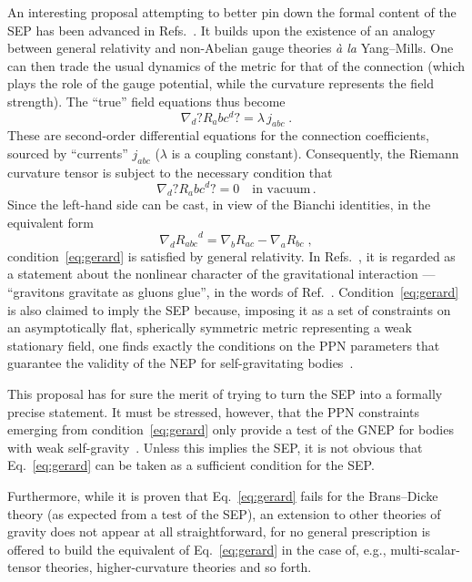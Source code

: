 \documentclass[a4paper,showkeys,aps,prd,reprint,nofootinbib,showpacs,twocolumn]{revtex4-1}
\newcommand{\eq}[1]{\( #1 \)}
\newcommand{\eqd}[1]{\begin{equation} #1 \end{equation}}
\theoremstyle{plain}
\begin{document}
An interesting proposal attempting to better pin down the formal content of the SEP has been advanced in Refs.~\cite{Gerard:2006ia, Gerard:2008nc}.  It builds upon the existence of an analogy between general relativity and non-Abelian gauge theories \emph{\`a la} Yang--Mills. One can then trade the usual dynamics of the metric for that of the connection (which plays the role of the gauge potential, while the curvature represents the field strength).  The ``true'' field equations thus become
%
\eqd{\nabla_{\! d} ?R_abc^d? = \lambda\, j_{abc} \;.
\label{gauge}}
%
These are second-order differential equations for the connection coefficients, sourced by ``currents'' \eq{j_{abc}} (\eq{\lambda} is a coupling constant).  Consequently, the Riemann curvature tensor is subject to the necessary condition that
%
\eqd{\nabla_{\! d} ?R_abc^d? = 0 \quad \text{in vacuum} \,. \label{eq:gerard}}
%
Since the left-hand side can be cast, in view of the Bianchi identities, in the equivalent form
%
\eqd{\nabla_{\! d} {R_{abc}}^d = \nabla_{\! b} R_{ac} - \nabla_{\! a} R_{bc} \;,\label{eq:rotR}}
%
condition~\eqref{eq:gerard} is satisfied by general relativity.  In Refs.~\cite{Gerard:2006ia, Gerard:2008nc}, it is regarded as a statement about the nonlinear character of the gravitational interaction --- ``gravitons gravitate as gluons glue'', in the words of Ref.~\cite{Gerard:2006ia}.  Condition~\eqref{eq:gerard} is also claimed to imply the SEP because, imposing it as a set of constraints on an asymptotically flat, spherically symmetric metric representing a weak stationary field, one finds exactly the conditions on the PPN parameters that guarantee the validity of the NEP for self-gravitating bodies~\cite{nordtvedt}.  

This proposal has for sure the merit of trying to turn the SEP into a  formally precise statement.  It must be stressed, however, that the PPN constraints emerging from condition~\eqref{eq:gerard} only provide a test of the GNEP for bodies with weak self-gravity~\cite{nordtvedt}.  Unless this implies the SEP, it is not obvious that Eq.~\eqref{eq:gerard} can be taken as a sufficient condition for the SEP.

Furthermore, while it is proven that Eq.~\eqref{eq:gerard} fails for the Brans--Dicke theory (as expected from a test of the SEP), an extension to other theories of gravity does not appear at all straightforward, for no general prescription is offered to build the equivalent of Eq.~\eqref{eq:gerard} in the case of, e.g., multi-scalar-tensor theories, higher-curvature theories and so forth.
\end{document}
